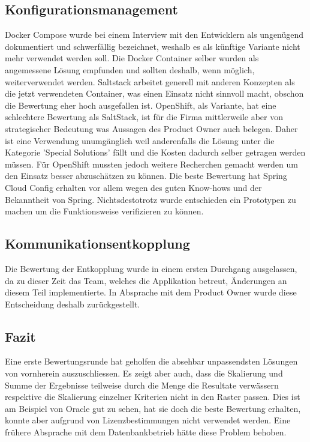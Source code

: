 \subsection{Konfigurationsmanagement}

Docker Compose wurde bei einem Interview mit den Entwicklern als ungenügend dokumentiert und schwerfällig bezeichnet, weshalb es als künftige Variante nicht mehr verwendet werden soll. Die Docker Container selber wurden als angemessene Lösung empfunden und sollten deshalb, wenn möglich, weiterverwendet werden. Saltstack arbeitet generell mit anderen Konzepten als die jetzt verwendeten Container, was einen Einsatz nicht sinnvoll macht, obschon die Bewertung eher hoch ausgefallen ist. OpenShift, als Variante, hat eine schlechtere Bewertung als SaltStack, ist für die Firma mittlerweile aber von strategischer Bedeutung was Aussagen des Product Owner auch belegen. Daher ist eine Verwendung unumgänglich weil anderenfalls die Lösung unter die Kategorie 'Special Solutions' fällt und die Kosten dadurch selber getragen werden müssen. Für OpenShift mussten jedoch weitere Recherchen gemacht werden um den Einsatz besser abzuschätzen zu können. Die beste Bewertung hat Spring Cloud Config erhalten vor allem wegen des guten Know-hows und der Bekanntheit von Spring. Nichtsdestotrotz wurde entschieden ein Prototypen zu machen um die Funktionsweise verifizieren zu können.

\subsection{Kommunikationsentkopplung}

Die Bewertung der Entkopplung wurde in einem ersten Durchgang ausgelassen, da zu dieser Zeit das Team, welches die Applikation betreut, Änderungen an diesem Teil implementierte. In Absprache mit dem Product Owner wurde diese Entscheidung deshalb zurückgestellt.

\subsection{Fazit}

Eine erste Bewertungsrunde hat geholfen die absehbar unpassendsten Lösungen von vornherein auszuschliessen. Es zeigt aber auch, dass die Skalierung und Summe der Ergebnisse teilweise durch die Menge die Resultate verwässern respektive die Skalierung einzelner Kriterien nicht in den Raster passen. Dies ist am Beispiel von Oracle gut zu sehen, hat sie doch die beste Bewertung erhalten, konnte aber aufgrund von Lizenzbestimmungen nicht verwendet werden. Eine frühere Absprache mit dem Datenbankbetrieb hätte diese Problem behoben.


